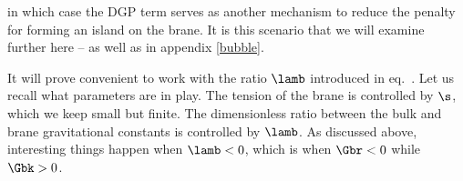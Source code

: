 in which case the DGP term serves as another mechanism to reduce the penalty for forming an island on the brane. It is this scenario that we will examine further here -- as well as in appendix \ref{bubble}.

It will prove convenient to work with the ratio $\lamb$ introduced in eq.~. Let us recall what parameters are in play. The tension of the brane is controlled by $\s$, which we keep small but finite. The dimensionless ratio between the bulk and brane gravitational constants is controlled by $\lamb$. As discussed above, interesting things happen when $\lamb<0$, which is when $\Gbr<0$ while $\Gbk>0$.

\begin{figure}[h]
	\def\svgwidth{\linewidth}
\end{figure}
